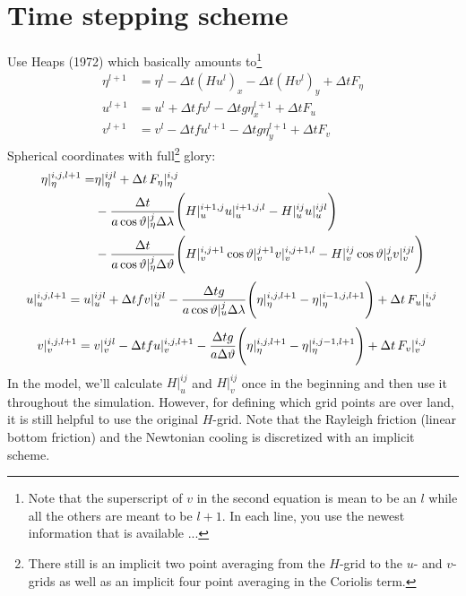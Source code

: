 \documentclass[a4paper]{article}
\begin{document}
\section{Time stepping scheme}
Use Heaps (1972) which basically amounts to\footnote{Note that the superscript
of $v$ in the second equation is mean to be an $l$ while all the others are meant
to be $l+1$. In each line, you use the newest information that is available ...}
\begin{align}
  \eta^{l+1} & = \eta^l - \Delta t (Hu^l)_x - \Delta t (Hv^l)_y + \Delta t F_\eta\\
  u^{l+1} & = u^l + \Delta t f v^l - \Delta t g \eta^{l+1}_x + \Delta t F_u\\
  v^{l+1} & = v^l - \Delta t f u^{l+1} - \Delta t g \eta^{l+1}_y + \Delta t F_v
\end{align}
Spherical coordinates with full\footnote{There still is an implicit two point
averaging from the $H$-grid to the $u$- and $v$-grids as well as an implicit
four point averaging in the Coriolis term.} glory:
\begin{equation}
  \begin{split}
    \eta|_\eta^{i,j,l+1}  =& \eta|_\eta^{ijl}  + \Delta t \,{F_\eta}\vert_{\eta}^{{i},{j}}\, \\
    & - \frac{\Delta t}{a\cos\vartheta|_\eta^{j}\Delta\lambda}
      \Biggl(H|_u^{i+1,j} u|_u^{i+1,j,l} - H|_u^{ij}u|_u^{ijl}\Biggr) \\
    & - \frac{\Delta t}{a\cos\vartheta|_\eta^{j}\Delta\vartheta}  
      \Biggl(H|_v^{i,j+1}\cos\vartheta|_v^{j+1}v|_v^{i,j+1,l} - H|_v^{ij}\cos\vartheta|_v^{j}v|_v^{ijl}\Biggr)
  \end{split}
\end{equation}
\begin{equation}
  u|_u^{i,j,l+1} = u|_u^{ijl} 
    + \Delta t f v|_u^{ijl}
    - \frac{\Delta t g}{a\cos\vartheta|_u^j\Delta\lambda}
      \Biggl(\eta|_\eta^{i,j,l+1} - \eta|_\eta^{i-1,j,l+1}\Biggr) + \Delta t \,{F_u}\vert_{u}^{{i},{j}}\,
\end{equation}
\begin{equation}
  v|_v^{i,j,l+1} = v|_v^{ijl} 
    - \Delta t f u|_v^{i,j,l+1} 
    - \frac{\Delta t g}{a\Delta\vartheta}
      \Biggl(\eta|_\eta^{i,j,l+1} - \eta|_\eta^{i,j-1,l+1}\Biggr) + \Delta t \,{F_v}\vert_{v}^{{i},{j}}\,
\end{equation}
In the model, we'll calculate $H|_u^{ij}$ and $H|_v^{ij}$ once in the beginning and
then use it throughout the simulation. However, for defining which grid points are 
over land, it is still helpful to use the original $H$-grid.
Note that the Rayleigh friction (linear bottom friction) and the Newtonian cooling
is discretized with an implicit scheme. 
\end{document}
